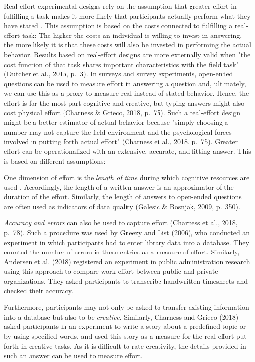 \documentclass{article}
\begin{document}
Real-effort experimental designs rely on the assumption that greater effort in fulfilling a task makes it more likely that participants actually perform what they have stated \parencite{Dutcher2015}. This assumption is based on the costs connected to fulfilling a real-effort task: The higher the costs an individual is willing to invest in answering, the more likely it is that these costs will also be invested in performing the actual behavior. Results based on real-effort designs are more externally valid when "the cost function of that task shares important characteristics with the field task" (Dutcher et al., 2015, p. 3). In surveys and survey experiments, open-ended questions can be used to measure effort in answering a question and, ultimately, we can use this as a proxy to measure real instead of stated behavior. Hence, the effort is for the most part cognitive and creative, but typing answers might also cost physical effort (Charness \& Grieco, 2018, p. 75). Such a real-effort design might be a better estimator of actual behavior because "simply choosing a number may not capture the field environment and the psychological forces involved in putting forth actual effort" (Charness et al., 2018, p. 75). Greater effort can be operationalized with an extensive, accurate, and fitting answer. This is based on different assumptions: 

One dimension of effort is the \emph{length of time} during which cognitive resources are used \parencite{Christensen-Szalanski1980}. Accordingly, the length of a written answer is an approximator of the duration of the effort. Similarly, the length of answers to open-ended questions are often used as indicators of data quality (Galesic \& Bosnjak, 2009, p. 350). 

\emph{Accuracy and errors} can also be used to capture effort (Charness et al., 2018, p. 78). Such a procedure was used by Gneezy and List (2006), who conducted an experiment in which participants had to enter library data into a database. They counted the number of errors in these entries as a measure of effort. Similarly, Andersen et al. (2018) registered an experiment in public administration research using this approach to compare work effort between public and private organizations. They asked participants to transcribe handwritten timesheets and checked their accuracy. 

Furthermore, participants may not only be asked to transfer existing information into a database but also to be \emph{creative}. Similarly, Charness and Grieco (2018) asked participants in an experiment to write a story about a predefined topic or by using specified words, and used this story as a measure for the real effort put forth in creative tasks. As it is difficult to rate creativity, the details provided in such an answer can be used to measure effort.
\end{document}
